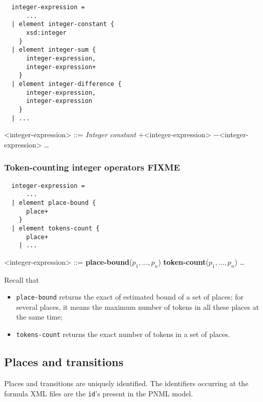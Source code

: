 \documentclass[10pt,english,a4paper]{article}
\newcommand\atomplacebnd[1]  {\textbf{place-bound}(#1)}
\newcommand\atomtokenscnt[1] {\textbf{token-count}(#1)}
\newcommand\exprplus         {\boldmath$+$\xspace}
\newcommand\exprminus        {\boldmath$-$\xspace}
\begin{document}
\begin{multicols}{2}
\begin{lstlisting}
  integer-expression =
      ...
  | element integer-constant {
      xsd:integer
    }
  | element integer-sum {
      integer-expression,
      integer-expression+
    }
  | element integer-difference {
      integer-expression,
      integer-expression
    }
  | ...
\end{lstlisting}
\columnbreak
\setlength{\grammarindent}{6em}
\begin{grammar}
<integer-expression> ::=
     \textit{Integer constant}
 \exprplus <integer-expression>
 \exprminus <integer-expression>
\alt \ldots
\end{grammar}
\end{multicols}

\subsubsection{Token-counting integer operators FIXME}

\begin{multicols}{2}
\begin{lstlisting}
  integer-expression =
      ...
  | element place-bound {
      place+
    }
  | element tokens-count {
      place+
    | ...
\end{lstlisting}
\columnbreak
\begin{grammar}
<integer-expression> ::=
     \atomplacebnd{$p_1, \ldots, p_n$}
\alt \atomtokenscnt{$p_1, \ldots, p_n$}
\alt \ldots
\end{grammar}
\end{multicols}

Recall that
\begin{itemize}
  \item \lstinline!place-bound! returns the exact of estimated bound of a set of places;
    for several places, it means the maximum number of tokens in all these places at the same
    time;
  \item \lstinline!tokens-count! returns the exact number of tokens in a set of places.
\end{itemize}

\subsection{Places and transitions}

Places and transitions are uniquely identified. The identifiers occurring at
the formula XML files are the \texttt{id}'s present in the PNML model.
\end{document}

